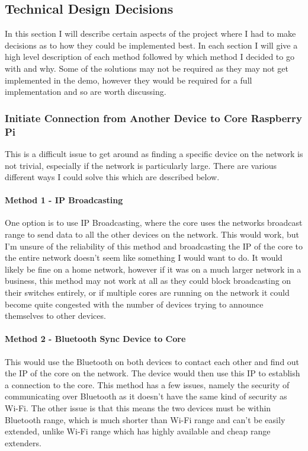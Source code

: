 \subsection{Technical Design Decisions}
In this section I will describe certain aspects of the project where I had to make decisions as to how they could be implemented best. In each section I will give a high level description of each method followed by which method I decided to go with and why. Some of the solutions may not be required as they may not get implemented in the demo, however they would be required for a full implementation and so are worth discussing.

\subsubsection{Initiate Connection from Another Device to Core Raspberry Pi}
This is a difficult issue to get around as finding a specific device on the network is not trivial, especially if the network is particularly large. There are various different ways I could solve this which are described below.

\paragraph{Method 1 - IP Broadcasting} One option is to use IP Broadcasting, where the core uses the networks broadcast range to send data to all the other devices on the network. This would work, but I'm unsure of the reliability of this method and broadcasting the IP of the core to the entire network doesn't seem like something I would want to do. It would likely be fine on a home network, however if it was on a much larger network in a business, this method may not work at all as they could block broadcasting on their switches entirely, or if multiple cores are running on the network it could become quite congested with the number of devices trying to announce themselves to other devices.

\paragraph{Method 2 - Bluetooth Sync Device to Core} This would use the Bluetooth on both devices to contact each other and find out the IP of the core on the network. The device would then use this IP to establish a connection to the core. This method has a few issues, namely the security of communicating over Bluetooth as it doesn't have the same kind of security as Wi-Fi. The other issue is that this means the two devices must be within Bluetooth range, which is much shorter than Wi-Fi range and can't be easily extended, unlike Wi-Fi range which has highly available and cheap range extenders.

